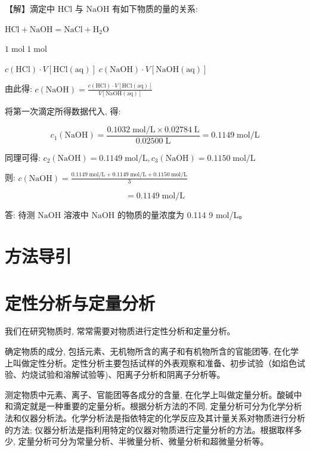 \documentclass[10pt]{article}
\begin{document}
【解】滴定中 \(\mathrm{{HCl}}\) 与 \(\mathrm{{NaOH}}\) 有如下物质的量的关系:

\(\mathrm{{HCl}} + \mathrm{{NaOH}} = \mathrm{{NaCl}} + {\mathrm{H}}_{2}\mathrm{O}\)

\(1\mathrm{\;{mol}}\;1\mathrm{\;{mol}}\)

\(c\left( \mathrm{{HCl}}\right) \cdot V\left\lbrack {\mathrm{{HCl}}\left( \mathrm{{aq}}\right) }\right\rbrack \;c\left( \mathrm{{NaOH}}\right) \cdot V\left\lbrack {\mathrm{{NaOH}}\left( \mathrm{{aq}}\right) }\right\rbrack\)

由此得: \(c\left( \mathrm{{NaOH}}\right) = \frac{c\left( \mathrm{{HCl}}\right) \cdot V\left\lbrack {\mathrm{{HCl}}\left( \mathrm{{aq}}\right) }\right\rbrack }{V\left\lbrack {\mathrm{{NaOH}}\left( \mathrm{{aq}}\right) }\right\rbrack }\)

将第一次滴定所得数据代入, 得:

\[
{c}_{1}\left( \mathrm{{NaOH}}\right) = \frac{{0.1032}\mathrm{\;{mol}}/\mathrm{L} \times {0.02784}\mathrm{\;L}}{{0.02500}\mathrm{\;L}} = {0.1149}\mathrm{\;{mol}}/\mathrm{L}
\]

同理可得: \({c}_{2}\left( \mathrm{{NaOH}}\right) = {0.1149}\mathrm{\;{mol}}/\mathrm{L},{c}_{3}\left( \mathrm{{NaOH}}\right) = {0.1150}\mathrm{\;{mol}}/\mathrm{L}\)

则: \(c\left( \mathrm{{NaOH}}\right) = \frac{{0.1149}\mathrm{\;{mol}}/\mathrm{L} + {0.1149}\mathrm{\;{mol}}/\mathrm{L} + {0.1150}\mathrm{\;{mol}}/\mathrm{L}}{3}\)

\[
= {0.1149}\mathrm{\;{mol}}/\mathrm{L}
\]

答: 待测 \(\mathrm{{NaOH}}\) 溶液中 \(\mathrm{{NaOH}}\) 的物质的量浓度为 0.114 9 mol/L。

\section*{方法导引}

\section*{定性分析与定量分析}

我们在研究物质时, 常常需要对物质进行定性分析和定量分析。

确定物质的成分, 包括元素、无机物所含的离子和有机物所含的官能团等, 在化学上叫做定性分析。定性分析主要包括试样的外表观察和准备、初步试验（如焰色试验、灼烧试验和溶解试验等)、阳离子分析和阴离子分析等。

测定物质中元素、离子、官能团等各成分的含量, 在化学上叫做定量分析。酸碱中和滴定就是一种重要的定量分析。根据分析方法的不同, 定量分析可分为化学分析法和仪器分析法。化学分析法是指依特定的化学反应及其计量关系对物质进行分析的方法; 仪器分析法是指利用特定的仪器对物质进行定量分析的方法。根据取样多少, 定量分析可分为常量分析、半微量分析、微量分析和超微量分析等。
\end{document}
